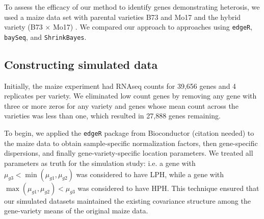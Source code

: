 \documentclass[useAMS,usenatbib,referee]{biom}
\begin{document}
To assess the efficacy of our method to identify genes demonstrating heterosis, we used a maize data set with parental varieties B73 and Mo17 and the hybrid variety (B73 $\times$ Mo17) \citep{paschold2012complementation}. We compared our approach to approaches using {\tt edgeR}, {\tt baySeq}, and {\tt ShrinkBayes}.


\subsection{Constructing simulated data}
\label{s:sim_data}

Initially, the maize experiment had RNAseq counts for 39,656 genes and 4 replicates per variety. We eliminated low count genes by removing any gene with three or more zeros for any variety and genes whose mean count across the varieties was less than one, which resulted in 27,888 genes remaining.


To begin, we applied the {\tt edgeR} package from Bioconductor (citation needed) to the maize data to obtain sample-specific normalization factors, then gene-specific dispersions, and finally gene-variety-specific location parameters. We treated all parameters as truth for the simulation study:  i.e. a gene with $\mu_{g3} < \min(\mu_{g1}, \mu_{g2})$ was considered to have LPH, while a gene with $\max(\mu_{g1},\mu_{g2}) < \mu_{g3}$ was considered to have HPH. This technique ensured that our simulated datasets maintained the existing covariance structure among the gene-variety means of the original maize data.
\end{document}
